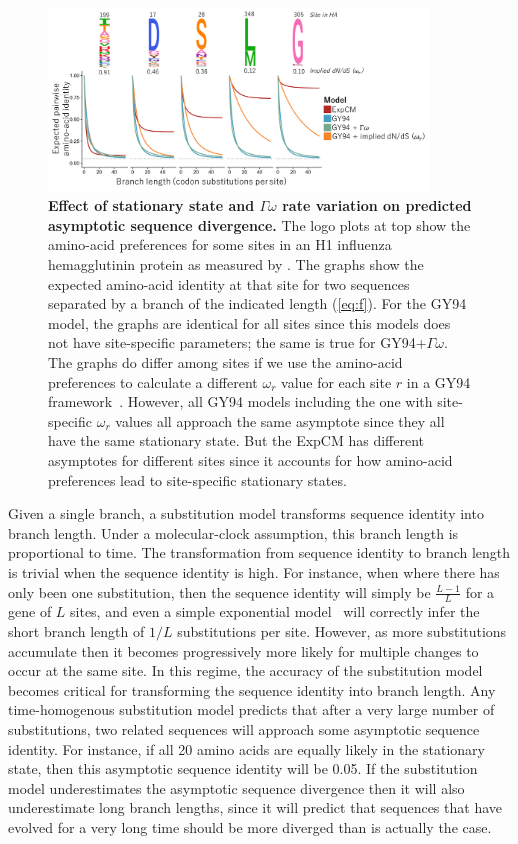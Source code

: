 \documentclass[11pt]{article}
\begin{document}
\begin{figure}
\centerline{\includegraphics[width=0.90\textwidth]{figures/decay.pdf}}
\caption{\label{fig:decay}
\textbf{Effect of stationary state and $\Gamma\omega$ rate variation on predicted asymptotic sequence divergence.}
The logo plots at top show the amino-acid preferences for some sites in an H1 influenza hemagglutinin protein as measured by \citet{doud2016accurate}.
The graphs show the expected amino-acid identity at that site for two sequences separated by a branch of the indicated length (\ref{eq:f}).
For the GY94 model, the graphs are identical for all sites since this models does not have site-specific parameters; the same is true for GY94+$\Gamma\omega$.
The graphs do differ among sites if we use the amino-acid preferences to calculate a different $\omega_r$ value for each site $r$ in a GY94 framework~\citep[\ref{eq:w_r};][]{spielman2015relationship}.
However, all GY94 models including the one with site-specific $\omega_r$ values all approach the same asymptote since they all have the same stationary state.
But the ExpCM has different asymptotes for different sites since it accounts for how amino-acid preferences lead to site-specific stationary states.
}
\end{figure}

Given a single branch, a substitution model transforms sequence identity into branch length.
Under a molecular-clock assumption, this branch length is proportional to time.
The transformation from sequence identity to branch length is trivial when the sequence identity is high.
For instance, when where there has only been one substitution, then the sequence identity will simply be $\frac{L - 1}{L}$ for a gene of $L$ sites, and even a simple exponential model~\citep{zuckerkandl1965} will correctly infer the short branch length of $1/L$ substitutions per site.
However, as more substitutions accumulate then it becomes progressively more likely for multiple changes to occur at the same site.
In this regime, the accuracy of the substitution model becomes critical for transforming the sequence identity into branch length.
Any time-homogenous substitution model predicts that after a very large number of substitutions, two related sequences will approach some asymptotic sequence identity.
For instance, if all 20 amino acids are equally likely in the stationary state, then this asymptotic sequence identity will be 0.05.
If the substitution model underestimates the asymptotic sequence divergence then it will also underestimate long branch lengths, since it will predict that sequences that have evolved for a very long time should be more diverged than is actually the case.
\end{document}
